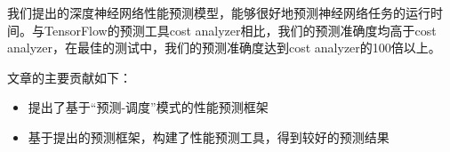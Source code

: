     我们提出的深度神经网络性能预测模型，能够很好地预测神经网络任务的运行时间。与TensorFlow的预测工具cost analyzer相比，我们的预测准确度均高于cost analyzer，在最佳的测试中，我们的预测准确度达到cost analyzer的100倍以上。

    文章的主要贡献如下：

    \begin{itemize}
        \setlength{\itemindent}{1em}
        \item 提出了基于“预测-调度”模式的性能预测框架
        \item 基于提出的预测框架，构建了性能预测工具，得到较好的预测结果
    \end{itemize}
